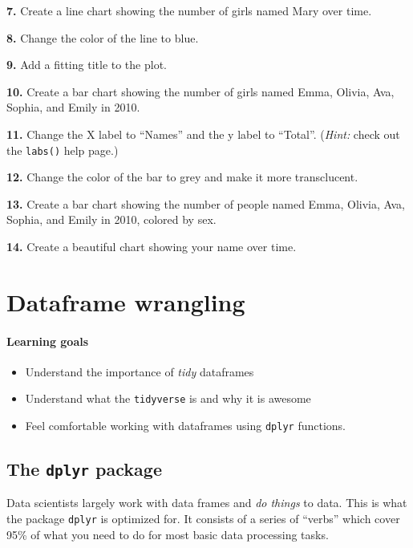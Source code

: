\documentclass[
]{book}
\providecommand{\tightlist}{%
  \setlength{\itemsep}{0pt}\setlength{\parskip}{0pt}}
\begin{document}
\textbf{7.} Create a line chart showing the number of girls named Mary over time.

\textbf{8.} Change the color of the line to blue.

\textbf{9.} Add a fitting title to the plot.

\textbf{10.} Create a bar chart showing the number of girls named Emma, Olivia, Ava, Sophia, and Emily in 2010.

\textbf{11.} Change the X label to ``Names'' and the y label to ``Total''. (\emph{Hint:} check out the \texttt{labs()} help page.)

\textbf{12.} Change the color of the bar to grey and make it more transclucent.

\textbf{13.} Create a bar chart showing the number of people named Emma, Olivia, Ava, Sophia, and Emily in 2010, colored by sex.

\textbf{14.} Create a beautiful chart showing your name over time.

\hypertarget{dplyr}{%
\chapter{Dataframe wrangling}\label{dplyr}}

\hypertarget{learning-goals-9}{%
\subsubsection*{Learning goals}\label{learning-goals-9}}

\begin{itemize}
\tightlist
\item
  Understand the importance of \emph{tidy} dataframes
\item
  Understand what the \texttt{tidyverse} is and why it is awesome
\item
  Feel comfortable working with dataframes using \texttt{dplyr} functions.
\end{itemize}

\hypertarget{the-dplyr-package}{%
\section*{\texorpdfstring{The \texttt{dplyr} package}{The dplyr package}}\label{the-dplyr-package}}

Data scientists largely work with data frames and \emph{do things} to data. This is what the package \texttt{dplyr} is optimized for. It consists of a series of ``verbs'' which cover 95\% of what you need to do for most basic data processing tasks.
\end{document}
